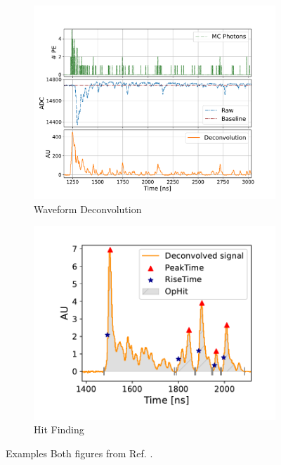 \begin{figure}[tbp!]
        \centering
        \begin{subfigure}[b]{0.59\textwidth}
            \centering
            \includegraphics[width=\textwidth]{pds_reco_deconvolution}
            \caption{Waveform Deconvolution}
            \label{fig:pds_reco_deconvolution}
        \end{subfigure}
        \hfill
        \begin{subfigure}[b]{0.4\textwidth}  
            \centering 
            \includegraphics[width=\textwidth]{pds_reco_hit_finding}
            \caption{Hit Finding}
            \label{fig:pds_reco_hit_finding}
        \end{subfigure}
        \caption[pds_reco]{
	Examples 
	Both figures from Ref. \cite{}.
	}
        \label{fig:pds_reco}
\end{figure}

